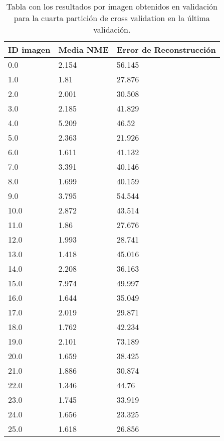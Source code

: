 \begin{table}[!ht]
    \centering
    \caption{Tabla con los resultados por imagen obtenidos en validación para la cuarta partición de cross validation en la última validación.}
    \begin{tabular}{|l|l|l|}
    \hline
        ID imagen & Media NME & Error de Reconstrucción \\ \hline
        0.0 & 2.154 & 56.145 \\ \hline
        1.0 & 1.81 & 27.876 \\ \hline
        2.0 & 2.001 & 30.508 \\ \hline
        3.0 & 2.185 & 41.829 \\ \hline
        4.0 & 5.209 & 46.52 \\ \hline
        5.0 & 2.363 & 21.926 \\ \hline
        6.0 & 1.611 & 41.132 \\ \hline
        7.0 & 3.391 & 40.146 \\ \hline
        8.0 & 1.699 & 40.159 \\ \hline
        9.0 & 3.795 & 54.544 \\ \hline
        10.0 & 2.872 & 43.514 \\ \hline
        11.0 & 1.86 & 27.676 \\ \hline
        12.0 & 1.993 & 28.741 \\ \hline
        13.0 & 1.418 & 45.016 \\ \hline
        14.0 & 2.208 & 36.163 \\ \hline
        15.0 & 7.974 & 49.997 \\ \hline
        16.0 & 1.644 & 35.049 \\ \hline
        17.0 & 2.019 & 29.871 \\ \hline
        18.0 & 1.762 & 42.234 \\ \hline
        19.0 & 2.101 & 73.189 \\ \hline
        20.0 & 1.659 & 38.425 \\ \hline
        21.0 & 1.886 & 30.874 \\ \hline
        22.0 & 1.346 & 44.76 \\ \hline
        23.0 & 1.745 & 33.919 \\ \hline
        24.0 & 1.656 & 23.325 \\ \hline
        25.0 & 1.618 & 26.856 \\ \hline
    \end{tabular}
    \label{table:Encode_images_4}
\end{table}

